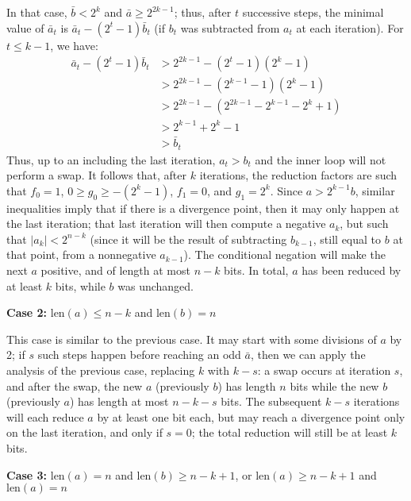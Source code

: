 \documentclass{llncs}
\newcommand{\bitlength}{\text{len}}
\begin{document}
In that case, $\bar b < 2^k$ and $\bar a \geq 2^{2k - 1}$; thus,
after $t$ successive steps, the minimal value of $\bar a_t$ is
$\bar a_t - (2^t - 1)\bar b_t$ (if $b_t$ was subtracted from $a_t$ at
each iteration). For $t \leq k-1$, we have:
\begin{align*}
    \bar a_t - (2^t - 1) \bar b_t &> 2^{2k - 1} - (2^t - 1) (2^k - 1) \\
        &> 2^{2k - 1} - (2^{k - 1} - 1) (2^k - 1) \\
        &> 2^{2k - 1} - (2^{2k - 1} - 2^{k - 1} - 2^k + 1) \\
        &> 2^{k - 1} + 2^k - 1 \\
        &> \bar b_t
\end{align*}
Thus, up to an including the last iteration, $a_t > b_t$ and the inner
loop will not perform a swap. It follows that, after $k$ iterations, the
reduction factors are such that $f_0 = 1$, $0\geq g_0\geq -(2^k-1)$,
$f_1 = 0$, and $g_1 = 2^k$. Since $a > 2^{k-1} b$, similar inequalities
imply that if there is a divergence point, then it may only happen at
the last iteration; that last iteration will then compute a negative
$a_k$, but such that $|a_k| < 2^{n-k}$ (since it will be the result of
subtracting $b_{k-1}$, still equal to $b$ at that point, from a
nonnegative $a_{k-1}$). The conditional negation will make the next $a$
positive, and of length at most $n-k$ bits. In total, $a$ has been reduced
by at least $k$ bits, while $b$ was unchanged.

\vspace{2ex}
\noindent\textsf{\textbf{Case 2:}} $\bitlength(a) \leq n-k$ and
$\bitlength(b) = n$

This case is similar to the previous case. It may start with some
divisions of $a$ by 2; if $s$ such steps happen before reaching an odd
$\bar a$, then we can apply the analysis of the previous case, replacing
$k$ with $k-s$: a swap occurs at iteration $s$, and after the swap,
the new $a$ (previously $b$) has length $n$ bits while the new $b$
(previously $a$) has length at most $n-k-s$ bits. The subsequent
$k-s$ iterations will each reduce $a$ by at least one bit each, but
may reach a divergence point only on the last iteration, and only if
$s = 0$; the total reduction will still be at least $k$ bits.

\vspace{2ex}
\noindent\textsf{\textbf{Case 3:}} $\bitlength(a) = n$ and
$\bitlength(b) \geq n - k + 1$, or $\bitlength(a) \geq n - k + 1$
and $\bitlength(a) = n$
\end{document}
